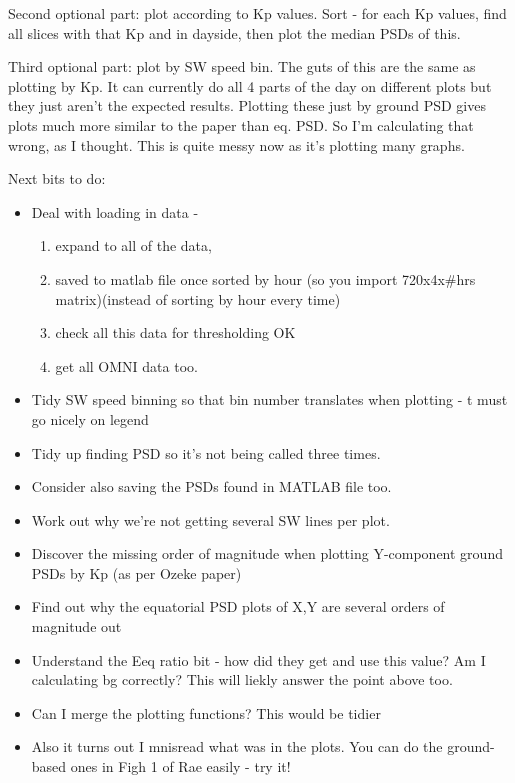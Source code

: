 \documentclass[11pt]{article}
\begin{document}
Second optional part: plot according to Kp values. Sort - for each Kp values, find all slices with
that Kp and in dayside, then plot the median PSDs of this.

Third optional part: plot by SW speed bin. The guts of this are the same as plotting by Kp. It can
currently do all 4 parts of the day on different plots but they just aren't the expected
results. Plotting these just by ground PSD gives plots much more similar to the paper than eq.
PSD. So I'm calculating that wrong, as I thought. This is quite messy now as it's plotting many
graphs.



Next bits to do:
\begin{itemize}
    \item Deal with loading in data - 
        \begin{enumerate}
            \item expand to all of the data, 
            \item saved to matlab file once sorted by hour (so you import 720x4x\#hrs matrix)(instead of sorting by hour every time)
            \item check all this data for thresholding OK
            \item get all OMNI data too.
        \end{enumerate}
    \item Tidy SW speed binning so that bin number translates when plotting - t must go nicely on
        legend
    \item Tidy up finding PSD so it's not being called three times.
    \item Consider also saving the PSDs found in MATLAB file too.
    \item Work out why we're not getting several SW lines per plot.
    \item Discover the missing order of magnitude when plotting Y-component ground PSDs by Kp (as
        per Ozeke paper)
    \item Find out why the equatorial PSD plots of X,Y are several orders of magnitude out
    \item Understand the Eeq ratio bit - how did they get and use this value? Am I calculating bg
        correctly? This will liekly
        answer the point above too.
    \item Can I merge the plotting functions? This would be tidier
    \item Also it turns out I mnisread what was in the plots. You can do the ground-based ones in
        Figh 1 of Rae easily - try it!
\end{itemize}
\end{document}
